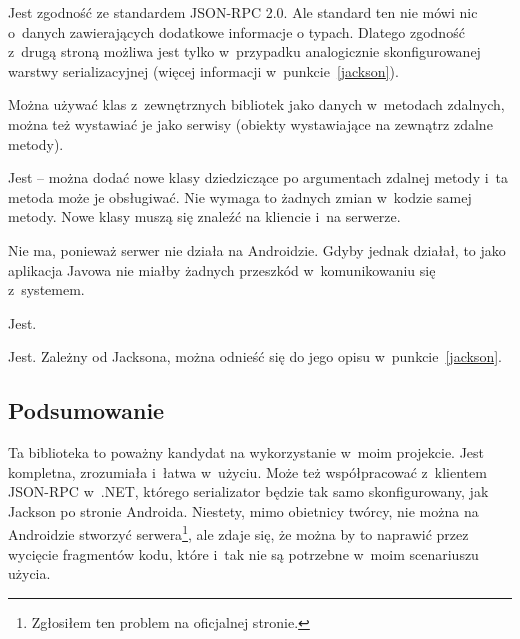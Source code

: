\begin{description}

Jest zgodność ze standardem JSON-RPC 2.0. Ale standard ten nie mówi nic o~danych zawierających dodatkowe informacje o typach.
Dlatego zgodność z~drugą stroną możliwa jest tylko w~przypadku analogicznie skonfigurowanej warstwy serializacyjnej (więcej informacji w~punkcie~\ref{jackson}).

Można używać klas z~zewnętrznych bibliotek jako danych w~metodach zdalnych, można też wystawiać je jako serwisy (obiekty wystawiające na zewnątrz zdalne metody).

Jest -- można dodać nowe klasy dziedziczące po argumentach zdalnej metody i~ta metoda może je obsługiwać. Nie wymaga to żadnych zmian w~kodzie samej metody. Nowe klasy muszą się znaleźć na kliencie i~na serwerze.

Nie ma, ponieważ serwer nie działa na Androidzie. Gdyby jednak działał, to jako aplikacja Javowa nie miałby żadnych przeszkód w~komunikowaniu się z~systemem.

Jest.

Jest. Zależny od Jacksona, można odnieść się do jego opisu w~punkcie~\ref{jackson}.
\end{description}

\subsection{Podsumowanie}
Ta biblioteka to poważny kandydat na wykorzystanie w~moim projekcie.
Jest kompletna, zrozumiała i~łatwa w~użyciu.
Może też współpracować z~klientem JSON-RPC w~.NET, którego serializator będzie tak samo skonfigurowany, jak Jackson po stronie Androida.
Niestety, mimo obietnicy twórcy, nie można na Androidzie stworzyć serwera\footnote{Zgłosiłem ten problem na oficjalnej stronie.}, ale zdaje się, że można by to naprawić przez wycięcie fragmentów kodu, które i~tak nie są potrzebne w~moim scenariuszu użycia.


